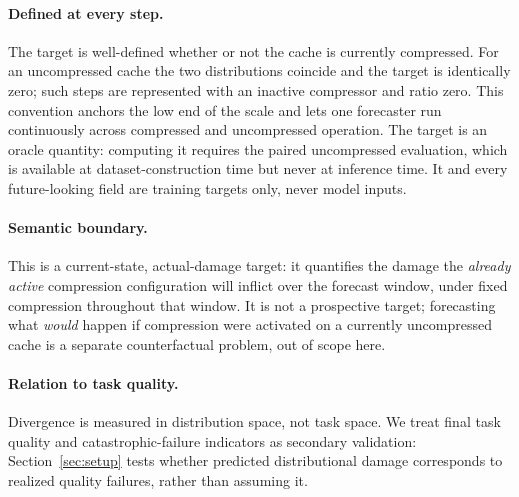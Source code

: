 \paragraph{Defined at every step.}
The target is well-defined whether or not the cache is currently compressed.
For an uncompressed cache the two distributions coincide and the target is
identically zero; such steps are represented with an inactive compressor and
ratio zero. This convention anchors the low end of the scale and lets one
forecaster run continuously across compressed and uncompressed operation. The
target is an oracle quantity: computing it requires the paired uncompressed
evaluation, which is available at dataset-construction time but never at
inference time. It and every future-looking field are training targets only,
never model inputs.

\paragraph{Semantic boundary.}
This is a current-state, actual-damage target: it quantifies the damage the
\emph{already active} compression configuration will inflict over the
forecast window, under fixed compression throughout that window. It is not a
prospective target; forecasting what \emph{would} happen if compression were
activated on a currently uncompressed cache is a separate counterfactual
problem, out of scope here.

\paragraph{Relation to task quality.}
Divergence is measured in distribution space, not task space. We treat final
task quality and catastrophic-failure indicators as secondary validation:
Section~\ref{sec:setup} tests whether predicted distributional damage
corresponds to realized quality failures, rather than assuming it.
